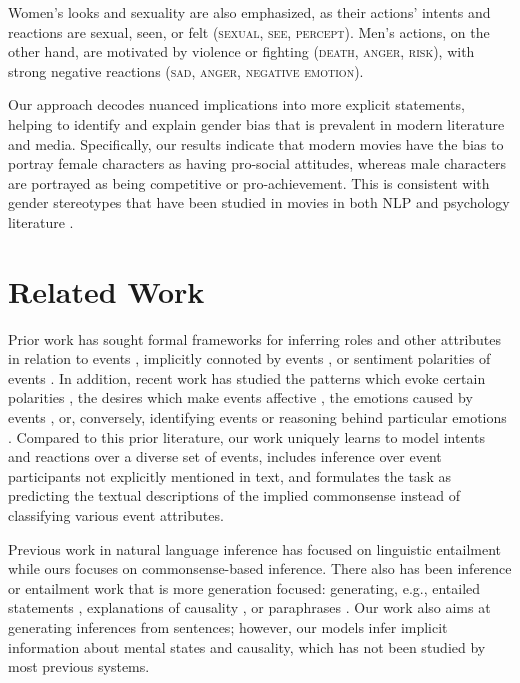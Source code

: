 \documentclass[11pt,a4paper]{article}
\begin{document}
Women's looks and sexuality are also 
emphasized, as their actions' intents and reactions are sexual, seen, or felt (\textsc{sexual}, \textsc{see}, \textsc{percept}).
Men's actions, on the other hand, are motivated by violence or fighting (\textsc{death}, \textsc{anger}, \textsc{risk}), with strong negative reactions (\textsc{sad}, \textsc{anger}, \textsc{negative emotion}).

Our approach decodes nuanced implications into  more explicit statements, helping to  identify and explain  gender bias that is  prevalent in modern literature and media. 
Specifically, our results indicate that modern movies have the bias to portray female characters as having  pro-social attitudes, whereas male characters are portrayed as being competitive or pro-achievement.
This is consistent with gender stereotypes that have been studied in movies in both NLP and psychology literature \cite{Agarwal2015-lq,Madaan2017AnalyzingGS,prentice2002women,england2011gender}.





%
 
\section{Related Work}


Prior work has sought formal frameworks for inferring roles and other attributes in relation to events \cite[][\emph{inter alia}]{FrameNet,das:2014:cl,VerbNet, VerbCorner}, implicitly connoted by events \cite{SemanticProtoroles, UniversalDecomp, ImplicitSent, Rashkin2016}, or   
sentiment polarities of events 
\cite{AffectiveEvents,gfbfpaper,SemEval2015,ding2018weakly}. In addition, recent work has studied the patterns which evoke certain polarities \cite{LexicoFP}, the desires which make events affective \cite{WhyAffect}, the emotions caused by events \cite{Vu2014}, or, conversely, identifying events or reasoning behind particular emotions \cite{EmotionCause}.  
Compared to this prior literature, 
our work uniquely learns to model intents and reactions over a diverse set of events, includes inference over event participants not explicitly mentioned in text, and formulates the task as predicting the textual descriptions of the implied commonsense instead of classifying various event attributes.


 


Previous work in natural language inference has focused on linguistic entailment \cite{SNLI,Bos2005} while ours  focuses on commonsense-based inference. There also has been inference or entailment work that is more generation focused: generating, e.g.,  entailed statements \cite{Zhang2017OrdinalCI,InferenceRoles}, explanations of causality \cite{Kang2017}, or  paraphrases  \cite{Dong2017LearningTP}.  
Our work also aims at generating inferences from sentences; however, our models infer implicit information about mental states and causality, which has not been studied by most previous systems. 
\end{document}
